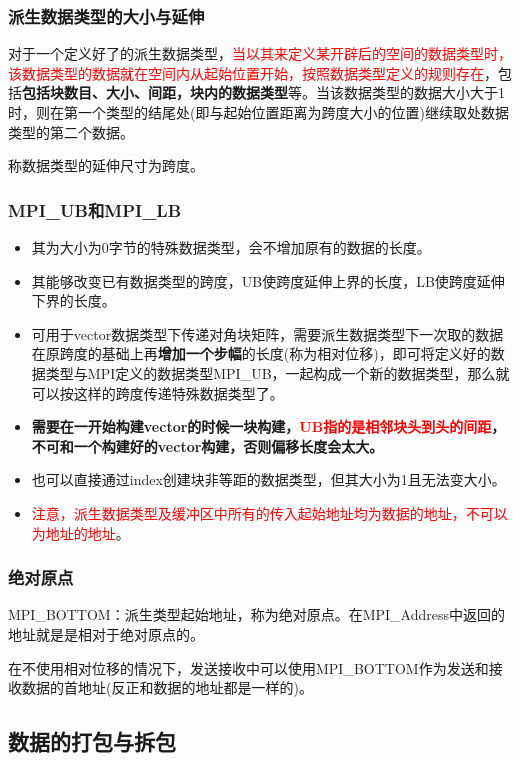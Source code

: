 \documentclass[UTF8]{article}%
\begin{document}
\subsubsection{派生数据类型的大小与延伸}

对于一个定义好了的派生数据类型，\textcolor{red}{当以其来定义某开辟后的空间的数据类型时，该数据类型的数据就在空间内从起始位置开始，按照数据类型定义的规则存在}，包括\textbf{包括块数目、大小、间距，块内的数据类型}等。当该数据类型的数据大小大于1时，则在第一个类型的结尾处(即与起始位置距离为跨度大小的位置)继续取处数据类型的第二个数据。

称数据类型的延伸尺寸为跨度。

\subsubsection{MPI\_UB和MPI\_LB}

\begin{itemize}
    \item 其为大小为0字节的特殊数据类型，会不增加原有的数据的长度。
    \item 其能够改变已有数据类型的跨度，UB使跨度延伸上界的长度，LB使跨度延伸下界的长度。
    \item 可用于vector数据类型下传递对角块矩阵，需要派生数据类型下一次取的数据在原跨度的基础上再\textbf{增加一个步幅}的长度(称为相对位移)，即可将定义好的数据类型与MPI定义的数据类型MPI\_UB，一起构成一个新的数据类型，那么就可以按这样的跨度传递特殊数据类型了。
    \item \textbf{需要在一开始构建vector的时候一块构建，\textcolor{red}{UB指的是相邻块头到头的间距}，不可和一个构建好的vector构建，否则偏移长度会太大。}
    \item 也可以直接通过index创建块非等距的数据类型，但其大小为1且无法变大小。
    \item \textcolor{red}{注意，派生数据类型及缓冲区中所有的传入起始地址均为数据的地址，不可以为地址的地址}。
\end{itemize}

\subsubsection{绝对原点}

MPI\_BOTTOM：派生类型起始地址，称为绝对原点。在MPI\_Address中返回的地址就是是相对于绝对原点的。

在不使用相对位移的情况下，发送接收中可以使用MPI\_BOTTOM作为发送和接收数据的首地址(反正和数据的地址都是一样的)。

\subsection{数据的打包与拆包}
\end{document}
